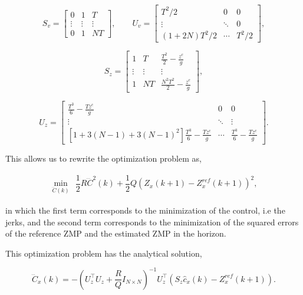 \begin{equation*}
  S_{v}=\begin{bmatrix} 0 & 1 & T \\ \vdots & \vdots & \vdots \\ 0 & 1 & NT \end{bmatrix}, \qquad
  U_{v}=\begin{bmatrix} T^2/2 & 0 & 0 \\ \vdots & \ddots & 0 \\ (1+2N)T^2/2 & \cdots & T^2/2 \end{bmatrix},
\end{equation*}

\begin{equation*}
  S_{z} = \begin{bmatrix} 1 & T & \frac{T^2}2-\frac{z^{c}}{g} \\ \vdots & \vdots & \vdots \\
                          1 & NT & \frac{N^2T^2}{2}-\frac{z^{c}}{g} \end{bmatrix},
\end{equation*}

\begin{equation*}
  U_{z} = \begin{bmatrix}
            \frac{T^3}{6}-\frac{Tz^{c}}{g} & 0 & 0 \\
          \vdots & \ddots & \vdots \\
          [1+3(N-1)+3(N-1)^2]\frac{T^3}{6}-\frac{Tz^{c}}{g} & \cdots & \frac{T^3}{6}-\frac{Tz^{c}}{g}
          \end{bmatrix}.
\end{equation*}

This allows us to rewrite the optimization problem as,

\begin{eqnarray}
\nonumber
\underset{\dddot{{C}}(k)}{\min} ~~ \dfrac{1}{2} R \dddot{{C}}^2(k) + \dfrac{1}{2} Q ({Z}_x(k+1) - {Z}^{ref}_x(k+1))^2,
\label{Eq:MinJerk}
\end{eqnarray}
 
in which the first term corresponds to the minimization of the control, i.e the jerks, and the second term corresponds to the minimization of the squared errors of the reference ZMP and the estimated ZMP in the horizon.

This optimization problem has the analytical solution,

\begin{equation}
\dddot{{C}}_x(k) = -({U}_z^{\top} {U}_z + \dfrac{R}{Q} {I}_{N \times N})^{-1} {U}_z^{\top}({S}_z \hat{c}_x(k) - {Z}_x^{ref}(k+1)).
\end{equation}

